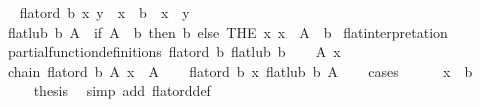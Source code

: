 \begin{isabellebody}
{}
\isamarkuptrue%
%
\endisatagdocument
{\isafolddocument}%
%
\isadelimdocument
%
\endisadelimdocument
{}\isamarkupfalse%
\ \isanewline
\ \ {\isachardoublequoteopen}flat{\isacharunderscore}{\kern0pt}ord\ b\ x\ y\ {\isasymlongleftrightarrow}\ x\ {\isacharequal}{\kern0pt}\ b\ {\isasymor}\ x\ {\isacharequal}{\kern0pt}\ y{\isachardoublequoteclose}\isanewline
\isanewline
{}\isamarkupfalse%
\ \isanewline
\ \ {\isachardoublequoteopen}flat{\isacharunderscore}{\kern0pt}lub\ b\ A\ {\isacharequal}{\kern0pt}\ {\isacharparenleft}{\kern0pt}if\ A\ {\isasymsubseteq}\ {\isacharbraceleft}{\kern0pt}b{\isacharbraceright}{\kern0pt}\ then\ b\ else\ {\isacharparenleft}{\kern0pt}THE\ x{\isachardot}{\kern0pt}\ x\ {\isasymin}\ A\ {\isacharminus}{\kern0pt}\ {\isacharbraceleft}{\kern0pt}b{\isacharbraceright}{\kern0pt}{\isacharparenright}{\kern0pt}{\isacharparenright}{\kern0pt}{\isachardoublequoteclose}\isanewline
\isanewline
{}\isamarkupfalse%
\ flat{\isacharunderscore}{\kern0pt}interpretation{\isacharcolon}{\kern0pt}\isanewline
\ \ {\isachardoublequoteopen}partial{\isacharunderscore}{\kern0pt}function{\isacharunderscore}{\kern0pt}definitions\ {\isacharparenleft}{\kern0pt}flat{\isacharunderscore}{\kern0pt}ord\ b{\isacharparenright}{\kern0pt}\ {\isacharparenleft}{\kern0pt}flat{\isacharunderscore}{\kern0pt}lub\ b{\isacharparenright}{\kern0pt}{\isachardoublequoteclose}\isanewline
%
\isadelimproof
%
\endisadelimproof
%
\isatagproof
{}\isamarkupfalse%
\isanewline
\ \ \isamarkupfalse%
\ A\ x\ \isamarkupfalse%
\ {}{\isacharcolon}{\kern0pt}\ {\isachardoublequoteopen}chain\ {\isacharparenleft}{\kern0pt}flat{\isacharunderscore}{\kern0pt}ord\ b{\isacharparenright}{\kern0pt}\ A{\isachardoublequoteclose}\ {\isachardoublequoteopen}x\ {\isasymin}\ A{\isachardoublequoteclose}\isanewline
\ \ \isamarkupfalse%
\ {\isachardoublequoteopen}flat{\isacharunderscore}{\kern0pt}ord\ b\ x\ {\isacharparenleft}{\kern0pt}flat{\isacharunderscore}{\kern0pt}lub\ b\ A{\isacharparenright}{\kern0pt}{\isachardoublequoteclose}\isanewline
\ \ \isamarkupfalse%
\ cases\isanewline
\ \ \ \ \isamarkupfalse%
\ {\isachardoublequoteopen}x\ {\isacharequal}{\kern0pt}\ b{\isachardoublequoteclose}\isanewline
\ \ \ \ \isamarkupfalse%
\ {\isacharquery}{\kern0pt}thesis\ \isamarkupfalse%
\ {\isacharparenleft}{\kern0pt}simp\ add{\isacharcolon}{\kern0pt}\ flat{\isacharunderscore}{\kern0pt}ord{\isacharunderscore}{\kern0pt}def{\isacharparenright}{\kern0pt}\isanewline

\end{isabellebody}
